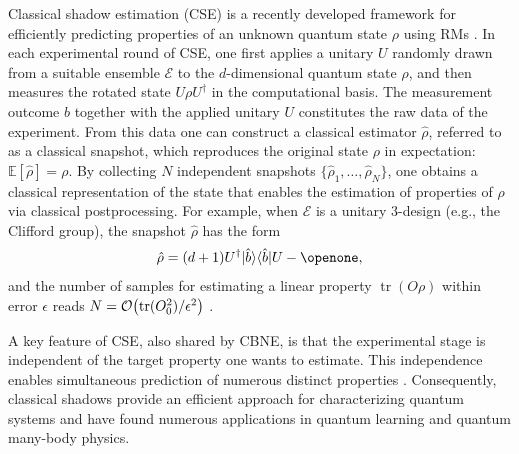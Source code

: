 \documentclass[aps,prl,twocolumn,nofootinbib,superscriptaddress,10pt]{revtex4-2}
\let\originalleft\left
\let\originalright\right
\renewcommand{\left}{\mathopen{}\mathclose\bgroup\originalleft}
\renewcommand{\right}{\aftergroup\egroup\originalright}
\def\>{\rangle}
\def\<{\langle}
\DeclareMathOperator{\Tr}{tr}
\newcommand{\bigo}[1]{\mathcal{O}\left(#1\right)}
\theoremstyle{plain}
\theoremstyle{definition}
\begin{document}
Classical shadow estimation (CSE) is a recently developed framework for efficiently predicting properties of an unknown quantum state $\rho$ using RMs \cite{HKPshadow20}. 
In each experimental round of CSE, one first applies a unitary $U$ randomly drawn from a suitable ensemble $\mathcal E$ to the $d$-dimensional quantum state $\rho$, and then measures the rotated state $U\rho U^\dagger$ in the computational basis. 
The measurement outcome $\hat{b}$ together with the applied unitary $U$ constitutes the raw data of the experiment. 
From this data one can construct a classical estimator $\hat{\rho}$, referred to as a classical snapshot, which reproduces the original state $\rho$ in expectation: $\mathbb{E}[\hat{\rho}] = \rho$. 
By collecting $N$ independent snapshots $\{\hat{\rho}_1,\dots,\hat{\rho}_N\}$, one obtains a classical representation of the state that enables the estimation of properties of $\rho$ via classical postprocessing. 
For example, when $\mathcal E$ is a unitary 3-design (e.g., the Clifford group), the snapshot $\hat\rho$ has the form
\begin{align}\label{eq:hatrhoCSE}
\hat\rho
= (d+1) U^{\dag}|\hat b\>\<\hat b| U -\openone , 
\end{align} 
and the number of samples for estimating a linear property $\Tr(O\rho)$ within error $\epsilon$ reads $N=\bigo{\Tr(O_0^2)/\epsilon^2}$ \cite{HKPshadow20}. 


A key feature of CSE, also shared by CBNE, is that the experimental stage is independent of the target property one wants to estimate. 
This independence enables simultaneous prediction of numerous distinct properties \cite{elben2023randomized,HKPshadow20}. 
Consequently, classical shadows provide an efficient approach for characterizing quantum systems and have found numerous applications in quantum learning and quantum many-body physics.
\end{document}

